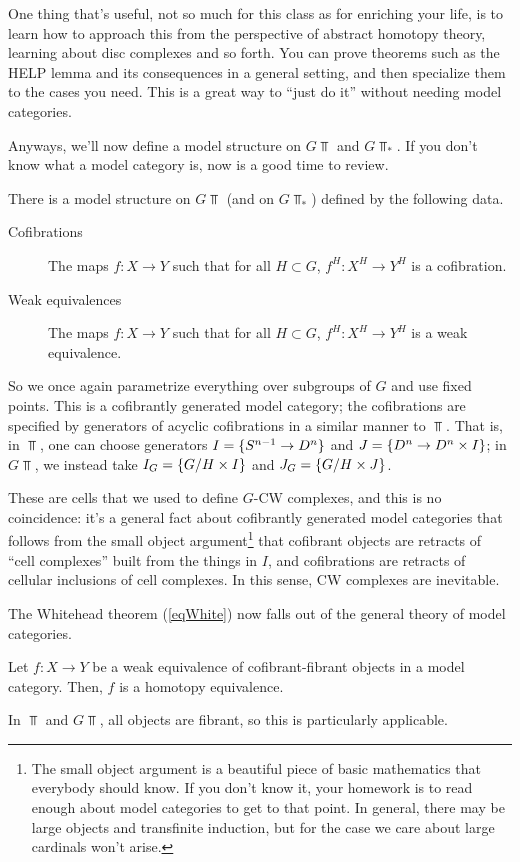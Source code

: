 One thing that's useful, not so much for this class as for enriching your life, is to learn how to approach this
from the perspective of abstract homotopy theory, learning about disc complexes and so forth. You can prove
theorems such as the HELP lemma and its consequences in a general setting, and then specialize them to the cases
you need. This is a great way to ``just do it'' without needing model categories.

Anyways, we'll now define a model structure on $G\Top$ and $G\Top_*$. If you don't know what a model category is,
now is a good time to review.
\begin{prop}
There is a model structure on $G\Top$ (and on $G\Top_*$) defined by the following data.
\begin{description}
	\item[Cofibrations] The maps $f\colon X\to Y$ such that for all $H\subset G$, $f^H\colon X^H\to Y^H$ is a
	cofibration.
	\item[Weak equivalences] The maps $f\colon X\to Y$ such that for all $H\subset G$, $f^H\colon X^H\to Y^H$ is a
	weak equivalence.
\end{description}
\end{prop}
So we once again parametrize everything over subgroups of $G$ and use fixed points. This is a cofibrantly generated
model category; the cofibrations are specified by generators of acyclic cofibrations in a similar manner to $\Top$.
That is, in $\Top$, one can choose generators $I = \{S^{n-1}\to D^n\}$ and $J = \{D^n\to D^n\times I\}$; in
$G\Top$, we instead take $I_G = \{G/H\times I\}$ and $J_G = \{G/H\times J\}$.

These are cells that we used to define $G$-CW complexes, and this is no coincidence: it's a general fact about
cofibrantly generated model categories that follows from the small object argument\footnote{The small object
argument is a beautiful piece of basic mathematics that everybody should know. If you don't know it, your homework
is to read enough about model categories to get to that point. In general, there may be large objects and
transfinite induction, but for the case we care about large cardinals won't arise.} that cofibrant objects are
retracts of ``cell complexes'' built from the things in $I$, and cofibrations are retracts of cellular inclusions
of cell complexes. In this sense, CW complexes are inevitable.

The Whitehead theorem (\cref{eqWhite}) now falls out of the general theory of model categories.
\begin{thm}
Let $f\colon X\to Y$ be a weak equivalence of cofibrant-fibrant objects in a model category. Then, $f$ is a
homotopy equivalence.
\end{thm}
In $\Top$ and $G\Top$, all objects are fibrant, so this is particularly applicable.
